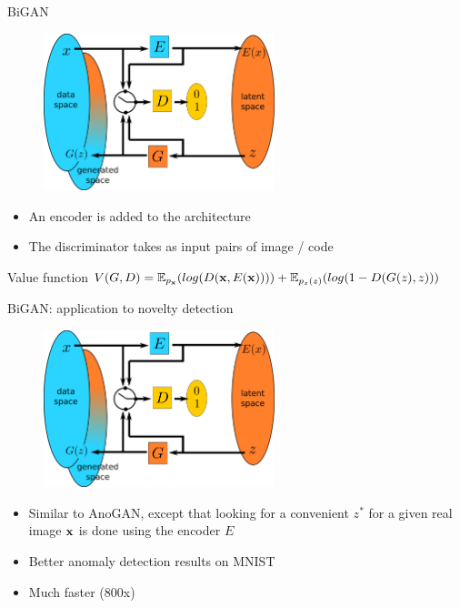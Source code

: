 \documentclass[xcolor=pdftex,dvipsnames,table,mathserif]{beamer}
\begin{document}
\begin{frame}{BiGAN}

  \begin{figure}[ht]
    \centering
    \includegraphics[width=0.6\textwidth]{bigan}
  \end{figure}

  \begin{itemize}
  \item An encoder is added to the architecture
  \item The discriminator takes as input pairs of image / code
  \end{itemize}

    \begin{block}{Value function}
    $V(G,D) = \mathbb{E}_{p_{\mathbf{x}}}(log(D(\mathbf{x}, E(\mathbf{x})))) + \mathbb{E}_{p_z(z)}(log(1 - D(G(z), z)))$
  \end{block}


\end{frame}

\begin{frame}{BiGAN: application to novelty detection \cite{zenati_efficient_2018}}

  \begin{figure}[ht]
    \centering
    \includegraphics[width=0.6\textwidth]{bigan}
  \end{figure}

  \begin{itemize}
  \item Similar to AnoGAN, except that looking for a convenient $z^*$ for a given real image $\mathbf{x}$ is done using the encoder $E$
  \item Better anomaly detection results on MNIST
  \item Much faster (800x)
  \end{itemize}


\end{frame}
\end{document}
